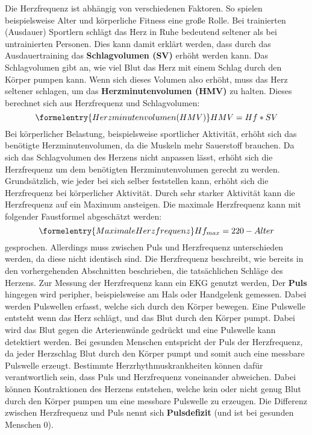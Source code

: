 Die Herzfrequenz ist abhängig von verschiedenen Faktoren. So spielen beispielsweise Alter und körperliche Fitness eine große Rolle. Bei trainierten (Ausdauer) Sportlern schlägt das Herz in Ruhe bedeutend seltener als bei untrainierten Personen. Dies kann damit erklärt werden, dass durch das Ausdauertraining das \textbf{Schlagvolumen (SV)} erhöht werden kann. Das Schlagvolumen gibt an, wie viel Blut das Herz mit einem Schlag durch den Körper pumpen kann. Wenn sich dieses Volumen also erhöht, muss das Herz seltener schlagen, um das \textbf{Herzminutenvolumen (HMV)} zu halten. Dieses berechnet sich aus Herzfrequenz und Schlagvolumen:
\begin{equation}\formelentry{Herzminutenvolumen (HMV)}
	HMV = Hf * SV
\end{equation} 
Bei körperlicher Belastung, beispielsweise sportlicher Aktivität, erhöht sich das benötigte Herzminutenvolumen, da die Muskeln mehr Sauerstoff brauchen. Da sich das Schlagvolumen des Herzens nicht anpassen lässt, erhöht sich die Herzfrequenz um dem benötigten Herzminutenvolumen gerecht zu werden. Grundsätzlich, wie jeder bei sich selber feststellen kann, erhöht sich die Herzfrequenz bei körperlicher Aktivität. Durch sehr starker Aktivität kann die Herzfrequenz auf ein Maximum ansteigen. Die maximale Herzfrequenz kann mit folgender Faustformel abgeschätzt werden: 
\begin{equation}\formelentry{Maximale Herzfrequenz}
	Hf_{max} = 220 - Alter
\end{equation}
gesprochen. Allerdings muss zwischen Puls und Herzfrequenz unterschieden werden, da diese nicht identisch sind. 
Die Herzfrequenz beschreibt, wie bereits in den vorhergehenden Abschnitten beschrieben, die tatsächlichen Schläge des Herzens. Zur Messung der Herzfrequenz kann ein EKG genutzt werden,
Der \textbf{Puls} hingegen wird peripher, beispielsweise am Hals oder Handgelenk gemessen. Dabei werden Pulswellen erfasst, welche sich durch den Körper bewegen. Eine Pulswelle entsteht wenn das Herz schlägt, und das Blut durch den Körper pumpt. Dabei wird das Blut gegen die Arterienwände gedrückt und eine Pulswelle kann detektiert werden.
Bei gesunden Menschen entspricht der Puls der Herzfrequenz, da jeder Herzschlag Blut durch den Körper pumpt und somit auch eine messbare Pulswelle erzeugt. Bestimmte Herzrhythmuskrankheiten können dafür verantwortlich sein, dass Puls und Herzfrequenz voneinander abweichen. Dabei können Kontraktionen des Herzens entstehen, welche kein oder nicht genug Blut durch den Körper pumpen um eine messbare Pulswelle zu erzeugen. Die Differenz zwischen Herzfrequenz und Puls nennt sich \textbf{Pulsdefizit} (und ist bei gesunden Menschen 0).

